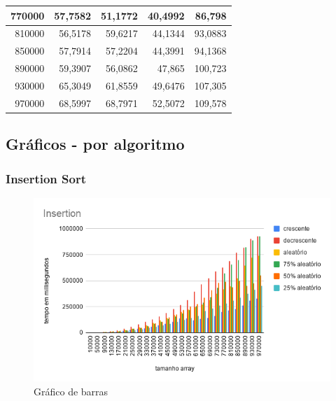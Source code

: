 \documentclass[a4paper, 12pt]{article}
\begin{document}
\begin{longtable}[c]{@{}rrrrr@{}}
	\multicolumn{1}{|r|}{770000}                  & \multicolumn{1}{r|}{57,7582}       & \multicolumn{1}{r|}{51,1772}       & \multicolumn{1}{r|}{40,4992}       & \multicolumn{1}{r|}{86,798}        \\* \midrule
	\multicolumn{1}{|r|}{810000}                  & \multicolumn{1}{r|}{56,5178}       & \multicolumn{1}{r|}{59,6217}       & \multicolumn{1}{r|}{44,1344}       & \multicolumn{1}{r|}{93,0883}       \\* \midrule
	\multicolumn{1}{|r|}{850000}                  & \multicolumn{1}{r|}{57,7914}       & \multicolumn{1}{r|}{57,2204}       & \multicolumn{1}{r|}{44,3991}       & \multicolumn{1}{r|}{94,1368}       \\* \midrule
	\multicolumn{1}{|r|}{890000}                  & \multicolumn{1}{r|}{59,3907}       & \multicolumn{1}{r|}{56,0862}       & \multicolumn{1}{r|}{47,865}        & \multicolumn{1}{r|}{100,723}       \\* \midrule
	\multicolumn{1}{|r|}{930000}                  & \multicolumn{1}{r|}{65,3049}       & \multicolumn{1}{r|}{61,8559}       & \multicolumn{1}{r|}{49,6476}       & \multicolumn{1}{r|}{107,305}       \\* \midrule
	\multicolumn{1}{|r|}{970000}                  & \multicolumn{1}{r|}{68,5997}       & \multicolumn{1}{r|}{68,7971}       & \multicolumn{1}{r|}{52,5072}       & \multicolumn{1}{r|}{109,578}       \\* \bottomrule
\end{longtable}
	\newpage
\subsection{Gráficos - por algoritmo }
		
		\subsubsection{Insertion Sort}

\begin{figure}[!h]
	\caption{ Gráfico de barras }
	\label{fig:insertion1}
	\centering
	\includegraphics[width=1.1\textwidth, height=0.60\textwidth]{Insertion}
\end{figure}
\end{document}
